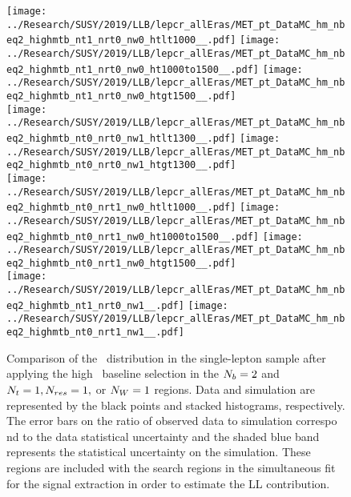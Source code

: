 \begin{figure}[!htb]
	\begin{center}
  \texttt{[image: ../Research/SUSY/2019/LLB/lepcr\_allEras/MET\_pt\_DataMC\_hm\_nbeq2\_highmtb\_nt1\_nrt0\_nw0\_htlt1000\_\_.pdf]}
  \texttt{[image: ../Research/SUSY/2019/LLB/lepcr\_allEras/MET\_pt\_DataMC\_hm\_nbeq2\_highmtb\_nt1\_nrt0\_nw0\_ht1000to1500\_\_.pdf]}
  \texttt{[image: ../Research/SUSY/2019/LLB/lepcr\_allEras/MET\_pt\_DataMC\_hm\_nbeq2\_highmtb\_nt1\_nrt0\_nw0\_htgt1500\_\_.pdf]} \\
  \texttt{[image: ../Research/SUSY/2019/LLB/lepcr\_allEras/MET\_pt\_DataMC\_hm\_nbeq2\_highmtb\_nt0\_nrt0\_nw1\_htlt1300\_\_.pdf]} 
  \texttt{[image: ../Research/SUSY/2019/LLB/lepcr\_allEras/MET\_pt\_DataMC\_hm\_nbeq2\_highmtb\_nt0\_nrt0\_nw1\_htgt1300\_\_.pdf]} \\
  \texttt{[image: ../Research/SUSY/2019/LLB/lepcr\_allEras/MET\_pt\_DataMC\_hm\_nbeq2\_highmtb\_nt0\_nrt1\_nw0\_htlt1000\_\_.pdf]} 
  \texttt{[image: ../Research/SUSY/2019/LLB/lepcr\_allEras/MET\_pt\_DataMC\_hm\_nbeq2\_highmtb\_nt0\_nrt1\_nw0\_ht1000to1500\_\_.pdf]} 
  \texttt{[image: ../Research/SUSY/2019/LLB/lepcr\_allEras/MET\_pt\_DataMC\_hm\_nbeq2\_highmtb\_nt0\_nrt1\_nw0\_htgt1500\_\_.pdf]} \\
  \texttt{[image: ../Research/SUSY/2019/LLB/lepcr\_allEras/MET\_pt\_DataMC\_hm\_nbeq2\_highmtb\_nt1\_nrt0\_nw1\_\_.pdf]} 
  \texttt{[image: ../Research/SUSY/2019/LLB/lepcr\_allEras/MET\_pt\_DataMC\_hm\_nbeq2\_highmtb\_nt0\_nrt1\_nw1\_\_.pdf]} \\
	\end{center}
	\caption[Lost Lepton HM Control Region $\nb=2$ with 1 heavy object]{Comparison of the \met~distribution in the single-lepton sample after applying the high \dm~baseline selection in the $\nb=2$ and $N_{t}=1, N_{res}=1,$ or $N_{W}=1$ regions. Data and simulation are represented by the black points and stacked histograms, respectively. The error bars on the ratio of observed data to simulation correspo    nd to the data statistical uncertainty and the shaded blue band represents the statistical uncertainty on the simulation. These regions are included with the search regions in the simultaneous fit for the signal extraction in order to estimate the LL contribution.
	 }
	\label{fig:llb-1lcr-datavsmc-hm-nb2-1}
\end{figure}

